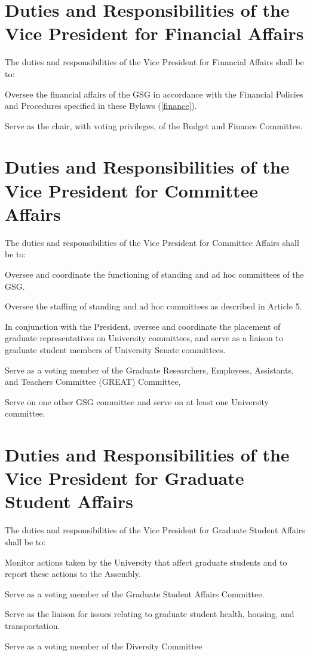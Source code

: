 \section{Duties and Responsibilities of the Vice President for Financial Affairs}
The duties and responsibilities of the Vice President for Financial Affairs shall be to:
\begin{bylaws-number}
  \item Oversee the financial affairs of the GSG in accordance with the Financial Policies and Procedures specified in these Bylaws (\chaptername \ref{finance}).
  \item Serve as the chair, with voting privileges, of the Budget and Finance Committee.
\end{bylaws-number}

\section{Duties and Responsibilities of the Vice President for Committee Affairs}
The duties and responsibilities of the Vice President for Committee Affairs shall be to:
\begin{bylaws-number}
  \item Oversee and coordinate the functioning of standing and ad hoc committees of the GSG.
  \item Oversee the staffing of standing and ad hoc committees as described in Article 5.
  \item In conjunction with the President, oversee and coordinate the placement of graduate representatives on University committees, and serve as a liaison to graduate student members of University Senate committees.
  \item Serve as a voting member of the Graduate Researchers, Employees, Assistants, and Teachers Committee (GREAT) Committee,
  \item Serve on one other GSG committee and serve on at least one University committee.
\end{bylaws-number}

\section{Duties and Responsibilities of the Vice President for Graduate Student Affairs}
The duties and responsibilities of the Vice President for Graduate Student Affairs shall be to:
\begin{bylaws-number}
  \item Monitor actions taken by the University that affect graduate students and to report these actions to the Assembly.
  \item Serve as a voting member of the Graduate Student Affairs Committee.
  \item Serve as the liaison for issues relating to graduate student health, housing, and transportation.
  \item Serve as a voting member of the Diversity Committee
\end{bylaws-number}

